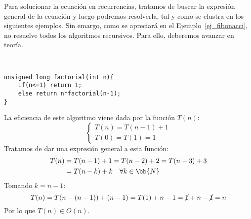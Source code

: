 Para solucionar la ecuación en recurrencias, tratamos de buscar la expresión general de la ecuación y luego podremos resolverla, tal y como se elustra en los siguientes ejemplos. Sin emargo, como se apreciará en el Ejemplo~\ref{ej_fibonacci}, no resuelve todos los algoritmos recursivos. Para ello, deberemos avanzar en teoría.
\begin{ejemplo}[Factorial]
\ \\
\begin{listing}[H]
\begin{verbatim}
unsigned long factorial(int n){
    if(n<=1) return 1;
    else return n*factorial(n-1);
}
\end{verbatim}
\end{listing}
La eficiencia de este algoritmo viene dada por la función $T(n)$:
\begin{equation*}
    \left\{ \begin{array}{l}
        T(n) = T(n-1)+1\\
        T(0) = T(1)=1
    \end{array}\right.
\end{equation*}
Tratamos de dar una expresión general a esta función:
\begin{align*}
    T(n) &= T(n-1)+1 = T(n-2)+2 = T(n-3)+3\\
    &= T(n-k)+k\quad \forall k \in \bb{N}
\end{align*}
Tomando $k = n-1$:
\begin{equation*}
    T(n) = T(n-(n-1))+(n-1) = T(1) + n-1 = \cancel{1}+n-\cancel{1} = n
\end{equation*}
Por lo que $T(n) \in O(n)$.
\end{ejemplo}

